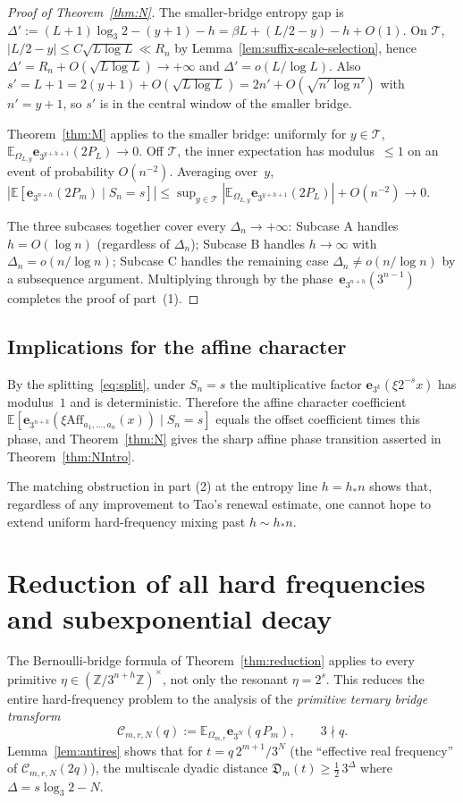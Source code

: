 \documentclass[11pt,a4paper]{amsart}
\theoremstyle{plain}
\theoremstyle{definition}
\newcommand{\Z}{\mathbb{Z}}
\newcommand{\E}{\mathbb{E}}
\newcommand{\Aff}{\mathrm{Aff}}
\begin{document}
\begin{proof}[Proof of Theorem~\ref{thm:N}]
The smaller-bridge entropy gap is
$\Delta':=(L+1)\log_3 2-(y+1)-h=\beta L+(L/2-y)-h+O(1)$.
On $\mathcal T$, $|L/2-y|\le C\sqrt{L\log L}\ll R_n$ by
Lemma~\ref{lem:suffix-scale-selection}, hence
$\Delta'=R_n+O(\sqrt{L\log L})\to+\infty$ and
$\Delta'=o(L/\log L)$.
Also $s'=L+1=2(y+1)+O(\sqrt{L\log L})=2n'+O(\sqrt{n'\log n'})$ with $n'=y+1$,
so $s'$ is in the central window of the smaller bridge.

Theorem~\ref{thm:M} applies to the smaller bridge: uniformly for
$y\in\mathcal T$,
$\E_{\Omega_{L,y}}\mathbf e_{3^{y+h+1}}(2P_L)\to 0$.
Off $\mathcal T$, the inner expectation has modulus~$\le 1$ on an event
of probability $O(n^{-2})$.
Averaging over~$y$,
$|\E[\mathbf e_{3^{n+h}}(2P_m)\mid S_n=s]|\le\sup_{y\in\mathcal T}|\E_{\Omega_{L,y}}\mathbf e_{3^{y+h+1}}(2P_L)|+O(n^{-2})\to 0$.

The three subcases together cover every $\Delta_n\to+\infty$:
Subcase A handles $h=O(\log n)$ (regardless of $\Delta_n$);
Subcase B handles $h\to\infty$ with $\Delta_n=o(n/\log n)$;
Subcase C handles the remaining case $\Delta_n\not=o(n/\log n)$ by a
subsequence argument.
Multiplying through by the phase~$\mathbf e_{3^{n+h}}(3^{n-1})$ completes
the proof of part~(1).
\end{proof}

\subsection{Implications for the affine character}
By the splitting~\eqref{eq:split}, under $S_n=s$ the multiplicative factor
$\mathbf e_{3^k}(\xi 2^{-s}x)$ has modulus~$1$ and is deterministic.
Therefore the affine character coefficient
$\E[\mathbf e_{3^{n+k}}(\xi\Aff_{a_1,\dots,a_n}(x))\mid S_n=s]$
equals the offset coefficient times this phase, and Theorem~\ref{thm:N}
gives the sharp affine phase transition asserted in
Theorem~\ref{thm:NIntro}.

The matching obstruction in part (2) at the entropy line $h=h_\ast n$ shows
that, regardless of any improvement to Tao's renewal estimate, one cannot
hope to extend uniform hard-frequency mixing past $h\sim h_\ast n$.

\section{Reduction of all hard frequencies and subexponential decay}\label{sec:reduction}

The Bernoulli-bridge formula of Theorem~\ref{thm:reduction}
applies to every primitive $\eta\in(\Z/3^{n+h}\Z)^\times$, not only the
resonant $\eta=2^s$.
This reduces the entire hard-frequency problem to the analysis of the
\emph{primitive ternary bridge transform}
\begin{equation}\label{eq:PTBT}
\mathcal C_{m,r,N}(q):=\E_{\Omega_{m,r}}\mathbf e_{3^N}(q\,P_m),\qquad
3\nmid q.
\end{equation}
Lemma~\ref{lem:antires} shows that for $t=q\,2^{m+1}/3^N$ (the ``effective
real frequency'' of $\mathcal C_{m,r,N}(2q)$), the multiscale dyadic
distance $\mathfrak D_m(t)\ge\frac12\,3^\Delta$ where
$\Delta=s\log_3 2-N$.
\end{document}
